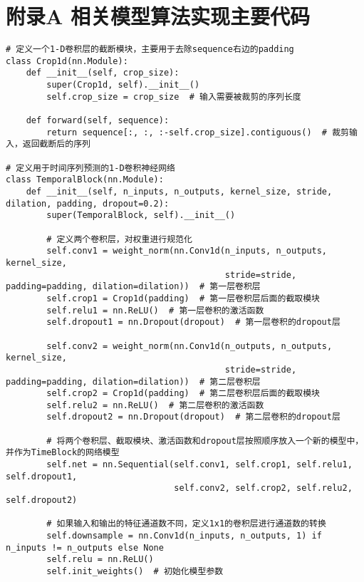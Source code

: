 \chapter{附录A 相关模型算法实现主要代码}

\begin{lstlisting}
# 定义一个1-D卷积层的截断模块，主要用于去除sequence右边的padding
class Crop1d(nn.Module):
    def __init__(self, crop_size):
        super(Crop1d, self).__init__()
        self.crop_size = crop_size  # 输入需要被裁剪的序列长度

    def forward(self, sequence):
        return sequence[:, :, :-self.crop_size].contiguous()  # 裁剪输入，返回截断后的序列

# 定义用于时间序列预测的1-D卷积神经网络
class TemporalBlock(nn.Module):
    def __init__(self, n_inputs, n_outputs, kernel_size, stride, dilation, padding, dropout=0.2):
        super(TemporalBlock, self).__init__()

        # 定义两个卷积层，对权重进行规范化
        self.conv1 = weight_norm(nn.Conv1d(n_inputs, n_outputs, kernel_size,
                                           stride=stride, padding=padding, dilation=dilation))  # 第一层卷积层
        self.crop1 = Crop1d(padding)  # 第一层卷积层后面的截取模块
        self.relu1 = nn.ReLU()  # 第一层卷积的激活函数
        self.dropout1 = nn.Dropout(dropout)  # 第一层卷积的dropout层

        self.conv2 = weight_norm(nn.Conv1d(n_outputs, n_outputs, kernel_size,
                                           stride=stride, padding=padding, dilation=dilation))  # 第二层卷积层
        self.crop2 = Crop1d(padding)  # 第二层卷积层后面的截取模块
        self.relu2 = nn.ReLU()  # 第二层卷积的激活函数
        self.dropout2 = nn.Dropout(dropout)  # 第二层卷积的dropout层

        # 将两个卷积层、截取模块、激活函数和dropout层按照顺序放入一个新的模型中，并作为TimeBlock的网络模型
        self.net = nn.Sequential(self.conv1, self.crop1, self.relu1, self.dropout1,
                                 self.conv2, self.crop2, self.relu2, self.dropout2)

        # 如果输入和输出的特征通道数不同，定义1x1的卷积层进行通道数的转换
        self.downsample = nn.Conv1d(n_inputs, n_outputs, 1) if n_inputs != n_outputs else None
        self.relu = nn.ReLU()
        self.init_weights()  # 初始化模型参数


\end{lstlisting}
